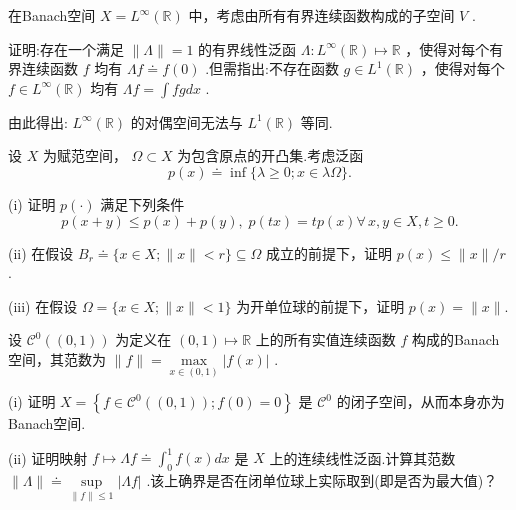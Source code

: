 \begin{rbhw}
在Banach空间 $X = {L}^{\infty }\left( \mathbb{R}\right)$ 中，考虑由所有有界连续函数构成的子空间 $V$ .

证明:存在一个满足 $\| \Lambda \|  = 1$ 的有界线性泛函 $\Lambda  : {L}^{\infty }\left( \mathbb{R}\right)  \mapsto  \mathbb{R}$ ，使得对每个有界连续函数 $f$ 均有 ${\Lambda f} \doteq  f\left( 0\right)$ .但需指出:不存在函数 $g \in  {L}^{1}\left( \mathbb{R}\right)$ ，使得对每个 $f \in  {L}^{\infty }\left( \mathbb{R}\right)$ 均有 ${\Lambda f} = \int {fgdx}$ .

由此得出: ${L}^{\infty }\left( \mathbb{R}\right)$ 的对偶空间无法与 ${L}^{1}\left( \mathbb{R}\right)$ 等同.
\end{rbhw}

\begin{rbhw}
设 $X$ 为赋范空间， $\Omega  \subset  X$ 为包含原点的开凸集.考虑泛函
\begin{equation}\tag{2.45}
p\left( x\right)  \doteq  \inf \{ \lambda  \geq  0;x \in  {\lambda \Omega }\} .
\end{equation}

(i) 证明 $p\left( \cdot \right)$ 满足下列条件
\[
p\left( {x + y}\right)  \leq  p\left( x\right)  + p\left( y\right) ,\;p\left( {tx}\right)  = {tp}\left( x\right) \forall\,x,y \in  X,t \geq  0.
\]

(ii) 在假设 ${B}_{r} \doteq  \{ x \in  X;\| x\|  < r\}  \subseteq  \Omega$ 成立的前提下，证明 $p\left( x\right)  \leq  \| x\| /r$ .

(iii) 在假设 $\Omega  = \{ x \in  X;\| x\|  < 1\}$ 为开单位球的前提下，证明 $p\left( x\right)  = \| x\| .$
\end{rbhw}

\begin{rbhw}
设 ${\mathcal{C}}^{0}\left( \left(  {0,1}\right)  \right)$ 为定义在 $\left(  {0,1}\right)   \mapsto  \mathbb{R}$ 上的所有实值连续函数 $f$ 构成的Banach空间，其范数为 $\| f\|  = \mathop{\max }\limits_{{x \in  \left(  {0,1}\right)  }}\left| {f\left( x\right) }\right|$ .

(i) 证明 $X = \left\{  {f \in  {\mathcal{C}}^{0}\left( \left(  {0,1}\right)  \right) ;f\left( 0\right)  = 0}\right\}$ 是 ${\mathcal{C}}^{0}$ 的闭子空间，从而本身亦为Banach空间.

(ii) 证明映射 $f \mapsto  {\Lambda f} \doteq  {\int }_{0}^{1}f\left( x\right) {dx}$ 是 $X$ 上的连续线性泛函.计算其范数 $\| \Lambda \|  \doteq  \mathop{\sup }\limits_{{\| f\|  \leq  1}}\left| {\Lambda f}\right|$ .该上确界是否在闭单位球上实际取到(即是否为最大值)？
\end{rbhw}


